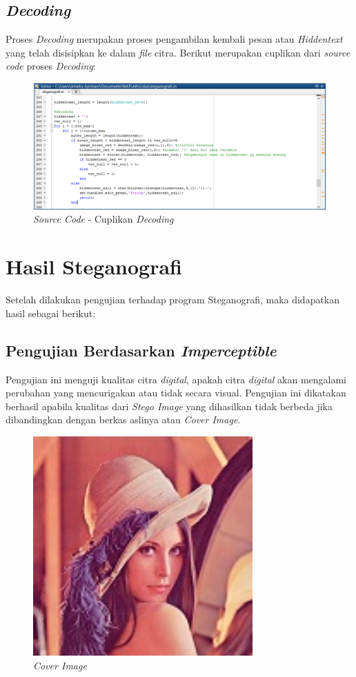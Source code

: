 \subsection{\emph{Decoding}}
Proses \emph{Decoding} merupakan proses pengambilan kembali pesan atau \emph{Hiddentext} yang telah disisipkan ke dalam \emph{file} citra. Berikut merupakan cuplikan dari \emph{source code} proses \emph{Decoding}:
	\begin{figure}[H]
		\centering
		\includegraphics[width=1\textwidth]{gambar/source_code/cuplikan_decoding}
		\caption{\emph{Source Code} - Cuplikan \emph{Decoding}}
		\label{cuplikan_decoding}
	\end{figure}
	
\section{Hasil Steganografi}
Setelah dilakukan pengujian terhadap program Steganografi, maka didapatkan hasil sebagai berikut:
	\subsection{Pengujian Berdasarkan \emph{Imperceptible}}
	Pengujian ini menguji kualitas citra \emph{digital}, apakah citra \emph{digital} akan mengalami perubahan yang mencurigakan atau tidak secara visual. Pengujian ini dikatakan berhasil apabila kualitas dari \emph{Stego Image} yang dihasilkan tidak berbeda jika dibandingkan dengan berkas aslinya atau \emph{Cover Image}.

	\begin{figure}[H]
		\centering
		\includegraphics[width=0.75\textwidth]{gambar/matlab/lena}
		\caption{\emph{Cover Image}}
		\label{lena_asli}
	\end{figure}

